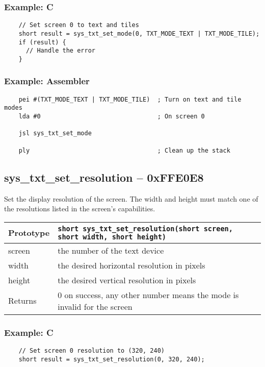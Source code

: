 \subsubsection*{Example: C}
\begin{lstlisting}
    // Set screen 0 to text and tiles
    short result = sys_txt_set_mode(0, TXT_MODE_TEXT | TXT_MODE_TILE);
    if (result) {
      // Handle the error
    }    
\end{lstlisting}

\subsubsection*{Example: Assembler}
\begin{verbatim}
    pei #(TXT_MODE_TEXT | TXT_MODE_TILE)  ; Turn on text and tile modes
    lda #0                                ; On screen 0
    
    jsl sys_txt_set_mode

    ply                                   ; Clean up the stack
\end{verbatim}

\subsection*{sys\_txt\_set\_resolution -- 0xFFE0E8}
Set the display resolution of the screen.
The width and height must match one of the resolutions listed in the screen's capabilities.

\bigskip

\begin{tabular}{|l||l|} \hline
Prototype & \lstinline!short sys_txt_set_resolution(short screen, short width, short height)! \\ \hline
screen & the number of the text device \\ \hline
width & the desired horizontal resolution in pixels \\ \hline
height & the desired vertical resolution in pixels \\ \hline
Returns & 0 on success, any other number means the mode is invalid for the screen \\ \hline
\end{tabular}

\subsubsection*{Example: C}
\begin{lstlisting}
    // Set screen 0 resolution to (320, 240)
    short result = sys_txt_set_resolution(0, 320, 240);
\end{lstlisting}

